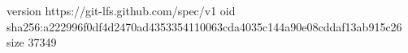 version https://git-lfs.github.com/spec/v1
oid sha256:a222996f0df4d2470ad4353354110063cda4035c144a90e08cddaf13ab915c26
size 37349
